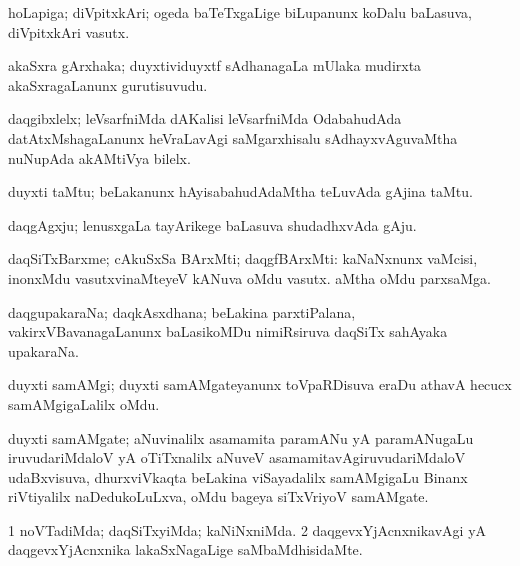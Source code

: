 \bentry
{}
\gl{\nA}
\bmng
hoLapiga; diVpitxkAri; ogeda baTeTxgaLige biLupanunx koDalu baLasuva, diVpitxkAri vasutx. 
\emng
\eentry

\bentry
{}
\gl{\nA}
\bmng
akaSxra gArxhaka; duyxtividuyxtf sAdhanagaLa mUlaka mudirxta akaSxragaLanunx gurutisuvudu. 
\emng
\eentry

\bentry
{}
\gl{\nA}
\bmng
daqgibxlelx; leVsarfniMda dAKalisi leVsarfniMda OdabahudAda datAtxMshagaLanunx heVraLavAgi saMgarxhisalu sAdhayxvAguvaMtha nuNupAda akAMtiVya bilelx. 
\emng
\eentry

\bentry
{}
\gl{\nA}
\bmng
duyxti taMtu; beLakanunx hAyisabahudAdaMtha teLuvAda gAjina taMtu. 
\emng
\eentry

\bentry
{}
\gl{\nA}
\bmng
daqgAgxju; lenusxgaLa tayArikege baLasuva shudadhxvAda gAju. 
\emng
\eentry

\bentry
{}
\gl{\nA}
\bmng
daqSiTxBarxme; cAkuSxSa BArxMti; daqgfBArxMti: 
\banum
{} kaNaNxnunx vaMcisi, inonxMdu vasutxvinaMteyeV kANuva oMdu vasutx. 
 aMtha oMdu parxsaMga. 
\eanum
\emng
\eentry

\bentry
{}
\gl{\nA}
\bmng
daqgupakaraNa; daqkAsxdhana; beLakina parxtiPalana, vakirxVBavanagaLanunx baLasikoMDu nimiRsiruva daqSiTx sahAyaka upakaraNa. 
\emng
\eentry

\bentry
{}
\gl{\nA}
\bmng
duyxti samAMgi; duyxti samAMgateyanunx toVpaRDisuva eraDu athavA hecucx samAMgigaLalilx oMdu. 
\emng
\eentry

\bentry
{}
\gl{\nA}
\bmng
duyxti samAMgate; aNuvinalilx asamamita paramANu yA paramANugaLu iruvudariMdaloV yA oTiTxnalilx aNuveV asamamitavAgiruvudariMdaloV udaBxvisuva, dhurxviVkaqta beLakina viSayadalilx samAMgigaLu Binanx riVtiyalilx naDedukoLuLxva, oMdu bageya siTxVriyoV samAMgate. 
\emng
\eentry

\bentry
{}
\gl{\kirxvi}
\bmng
\bnum
\num{1} noVTadiMda; daqSiTxyiMda; kaNiNxniMda. 
\num{2} daqgevxYjAcnxnikavAgi yA daqgevxYjAcnxnika lakaSxNagaLige saMbaMdhisidaMte. 
\enum
\emng
\eentry

